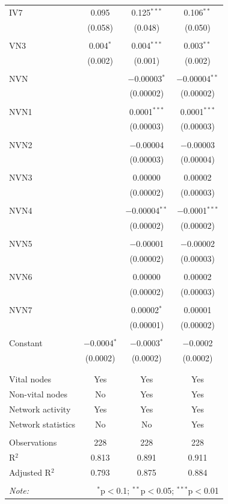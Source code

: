 \begin{table}[!htbp]
\begin{tabular}{@{\extracolsep{5pt}}lccc}
 IV7 & 0.095 & 0.125$^{***}$ & 0.106$^{**}$ \\ 
  & (0.058) & (0.048) & (0.050) \\ 
  & & & \\ 
 VN3 & 0.004$^{*}$ & 0.004$^{***}$ & 0.003$^{**}$ \\ 
  & (0.002) & (0.001) & (0.002) \\ 
  & & & \\ 
 NVN &  & $-$0.00003$^{*}$ & $-$0.00004$^{**}$ \\ 
  &  & (0.00002) & (0.00002) \\ 
  & & & \\ 
 NVN1 &  & 0.0001$^{***}$ & 0.0001$^{***}$ \\ 
  &  & (0.00003) & (0.00003) \\ 
  & & & \\ 
 NVN2 &  & $-$0.00004 & $-$0.00003 \\ 
  &  & (0.00003) & (0.00004) \\ 
  & & & \\ 
 NVN3 &  & 0.00000 & 0.00002 \\ 
  &  & (0.00002) & (0.00003) \\ 
  & & & \\ 
 NVN4 &  & $-$0.00004$^{**}$ & $-$0.0001$^{***}$ \\ 
  &  & (0.00002) & (0.00002) \\ 
  & & & \\ 
 NVN5 &  & $-$0.00001 & $-$0.00002 \\ 
  &  & (0.00002) & (0.00003) \\ 
  & & & \\ 
 NVN6 &  & 0.00000 & 0.00002 \\ 
  &  & (0.00002) & (0.00003) \\ 
  & & & \\ 
 NVN7 &  & 0.00002$^{*}$ & 0.00001 \\ 
  &  & (0.00001) & (0.00002) \\ 
  & & & \\ 
 Constant & $-$0.0004$^{*}$ & $-$0.0003$^{*}$ & $-$0.0002 \\ 
  & (0.0002) & (0.0002) & (0.0002) \\ 
  & & & \\ 
\hline \\[-1.8ex] 
Vital nodes & Yes & Yes & Yes \\ 
Non-vital nodes & No & Yes & Yes \\ 
Network activity & Yes & Yes & Yes \\ 
Network statistics & No & No & Yes \\ 
\hline &  &  &  \\ 
Observations & 228 & 228 & 228 \\ 
R$^{2}$ & 0.813 & 0.891 & 0.911 \\ 
Adjusted R$^{2}$ & 0.793 & 0.875 & 0.884 \\ 
\hline 
\hline \\[-1.8ex] 
\textit{Note:}  & \multicolumn{3}{r}{$^{*}$p$<$0.1; $^{**}$p$<$0.05; $^{***}$p$<$0.01} \\ 
\end{tabular} 
\end{table} 
